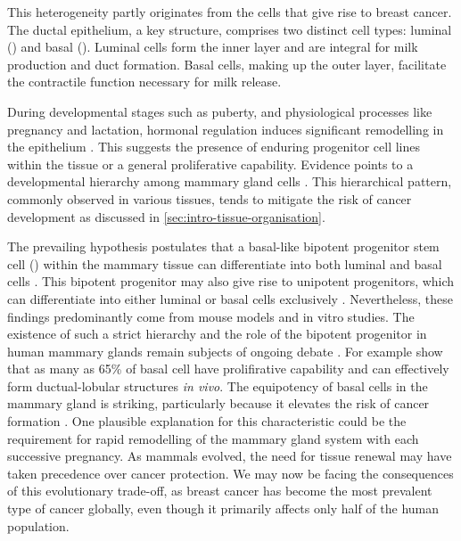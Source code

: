 This heterogeneity partly originates from the cells that give rise to breast cancer. The ductal epithelium, a key structure, comprises two distinct cell types: luminal () and basal (). Luminal cells form the inner layer and are integral for milk production and duct formation. Basal cells, making up the outer layer, facilitate the contractile function necessary for milk release.

During developmental stages such as puberty, and physiological processes like pregnancy and lactation, hormonal regulation induces significant remodelling in the epithelium \parencite{Macias2012-su}. This suggests the presence of enduring progenitor cell lines within the tissue or a general proliferative capability. Evidence points to a developmental hierarchy among mammary gland cells \parencite{Skibinski2015-rh}. This hierarchical pattern, commonly observed in various tissues, tends to mitigate the risk of cancer development as discussed in \cref{sec:intro-tissue-organisation}.

The prevailing hypothesis postulates that a basal-like bipotent progenitor stem cell () within the mammary tissue can differentiate into both luminal and basal cells \parencite{Stingl2001-cb,Prater2014-qd,Rios2014-jj}. This bipotent progenitor may also give rise to unipotent progenitors, which can differentiate into either luminal or basal cells exclusively \parencite{Van_Keymeulen2011-um,Rios2014-jj,Tao2014-ol}. Nevertheless, these findings predominantly come from mouse models and in vitro studies. The existence of such a strict hierarchy and the role of the bipotent progenitor in human mammary glands remain subjects of ongoing debate \parencite{Skibinski2015-rh}. For example \textcite{Prater2014-qd} show that as many as 65\% of basal cell have prolifirative capability and can effectively form ductual-lobular structures \emph{in vivo}. The equipotency of basal cells in the mammary gland is striking, particularly because it elevates the risk of cancer formation . One plausible explanation for this characteristic could be the requirement for rapid remodelling of the mammary gland system with each successive pregnancy. As mammals evolved, the need for tissue renewal may have taken precedence over cancer protection. We may now be facing the consequences of this evolutionary trade-off, as breast cancer has become the most prevalent type of cancer globally, even though it primarily affects only half of the human population.

